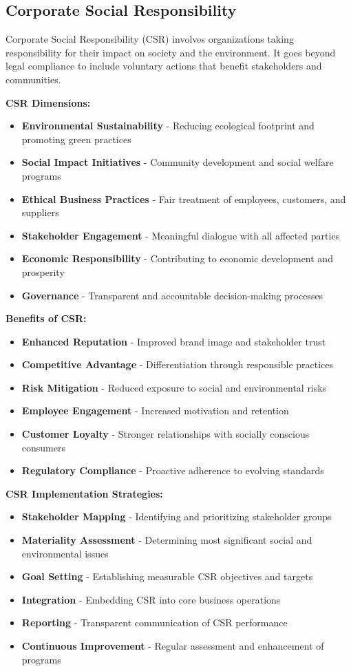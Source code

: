 \documentclass[12pt]{article}
\begin{document}
\subsection{Corporate Social Responsibility}
Corporate Social Responsibility (CSR) involves organizations taking responsibility for their impact on society and the environment. It goes beyond legal compliance to include voluntary actions that benefit stakeholders and communities.

\textbf{CSR Dimensions:}
\begin{itemize}
    \item \textbf{Environmental Sustainability} - Reducing ecological footprint and promoting green practices
    \item \textbf{Social Impact Initiatives} - Community development and social welfare programs
    \item \textbf{Ethical Business Practices} - Fair treatment of employees, customers, and suppliers
    \item \textbf{Stakeholder Engagement} - Meaningful dialogue with all affected parties
    \item \textbf{Economic Responsibility} - Contributing to economic development and prosperity
    \item \textbf{Governance} - Transparent and accountable decision-making processes
\end{itemize}

\textbf{Benefits of CSR:}
\begin{itemize}
    \item \textbf{Enhanced Reputation} - Improved brand image and stakeholder trust
    \item \textbf{Competitive Advantage} - Differentiation through responsible practices
    \item \textbf{Risk Mitigation} - Reduced exposure to social and environmental risks
    \item \textbf{Employee Engagement} - Increased motivation and retention
    \item \textbf{Customer Loyalty} - Stronger relationships with socially conscious consumers
    \item \textbf{Regulatory Compliance} - Proactive adherence to evolving standards
\end{itemize}

\textbf{CSR Implementation Strategies:}
\begin{itemize}
    \item \textbf{Stakeholder Mapping} - Identifying and prioritizing stakeholder groups
    \item \textbf{Materiality Assessment} - Determining most significant social and environmental issues
    \item \textbf{Goal Setting} - Establishing measurable CSR objectives and targets
    \item \textbf{Integration} - Embedding CSR into core business operations
    \item \textbf{Reporting} - Transparent communication of CSR performance
    \item \textbf{Continuous Improvement} - Regular assessment and enhancement of programs
\end{itemize}
\end{document}
